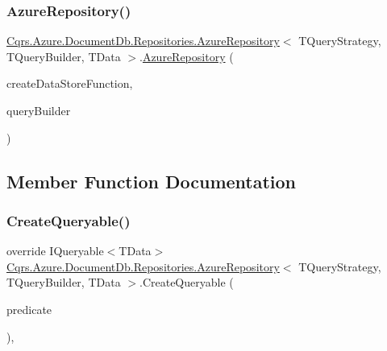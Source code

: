 \subsubsection{\texorpdfstring{Azure\+Repository()}{AzureRepository()}}
{\footnotesize\ttfamily \hyperlink{classCqrs_1_1Azure_1_1DocumentDb_1_1Repositories_1_1AzureRepository}{Cqrs.\+Azure.\+Document\+Db.\+Repositories.\+Azure\+Repository}$<$ T\+Query\+Strategy, T\+Query\+Builder, T\+Data $>$.\hyperlink{classCqrs_1_1Azure_1_1DocumentDb_1_1Repositories_1_1AzureRepository}{Azure\+Repository} (\begin{DoxyParamCaption}\item[{Func$<$ \hyperlink{interfaceCqrs_1_1DataStores_1_1IDataStore}{I\+Data\+Store}$<$ T\+Data $>$$>$}]{create\+Data\+Store\+Function,  }\item[{T\+Query\+Builder}]{query\+Builder }\end{DoxyParamCaption})\hspace{0.3cm}{\ttfamily [protected]}}



\subsection{Member Function Documentation}
\mbox{\label{classCqrs_1_1Azure_1_1DocumentDb_1_1Repositories_1_1AzureRepository_ac9ceeed80a02ced9a45b3443cd1f453f_ac9ceeed80a02ced9a45b3443cd1f453f}} 
\subsubsection{\texorpdfstring{Create\+Queryable()}{CreateQueryable()}}
{\footnotesize\ttfamily override I\+Queryable$<$T\+Data$>$ \hyperlink{classCqrs_1_1Azure_1_1DocumentDb_1_1Repositories_1_1AzureRepository}{Cqrs.\+Azure.\+Document\+Db.\+Repositories.\+Azure\+Repository}$<$ T\+Query\+Strategy, T\+Query\+Builder, T\+Data $>$.Create\+Queryable (\begin{DoxyParamCaption}\item[{Expression$<$ Func$<$ T\+Data, bool $>$$>$}]{predicate }\end{DoxyParamCaption})\hspace{0.3cm}{\ttfamily [protected]}, {\ttfamily [virtual]}}



